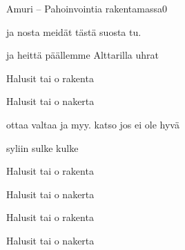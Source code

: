 \documentclass[12pt,a4paper]{article}
\begin{document}
\thispagestyle{empty}
\begin{mysong}{Amuri – Pahoinvointia rakentamassa}{0}

\begin{SBVerse}
   ja nosta meidät  tästä suosta 
  tu.

   ja heittä päällemme  Alttarilla
   uhrat
\end{SBVerse}

\begin{SBChorus}
  Halusit tai  o 
  rakenta
  
  Halusit tai  o 
  nakerta
\end{SBChorus}

\begin{SBVerse}
   ottaa valtaa ja  myy.  katso
   jos ei ole hyvä 

   syliin sulke 
   kulke
\end{SBVerse}

\begin{SBChorus}
  Halusit tai  o 
  rakenta
  
  Halusit tai  o 
  nakerta

  Halusit tai  o 
  rakenta
  
  Halusit tai  o 
  nakerta
\end{SBChorus}

\end{mysong}
\end{document}
